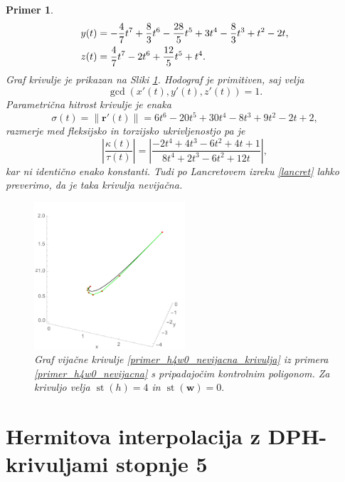 \documentclass[12pt,a4paper,twoside]{article}
\theoremstyle{definition} %
\theoremstyle{plain} %
\theoremstyle{primerstyle}
\newtheorem{primer}[definicija]{Primer}
\numberwithin{equation}{section}  %
\newcommand{\rV}{\mathbf{r}}
\newcommand{\wV}{\mathbf{w}}
\DeclareMathOperator{\st}{st}
\begin{document}
\begin{primer}
\begin{align}
		y(t)&=-\frac{4}{7}t^7+\frac{8}{3}t^6-\frac{28}{5}t^5+3t^4-\frac{8}{3}t^3+t^2-2t,\label{primer_h4w0_nevijacna_krivulja}\\
		z(t)&=\frac{4}{7}t^7-2t^6+\frac{12}{5}t^5+t^4.\notag
	\end{align}
	Graf krivulje je prikazan na Sliki \ref{fig:h4w0_nevijacna}. Hodograf je primitiven, saj velja $$\gcd(x'(t),y'(t),z'(t))=1.$$ Parametrična hitrost krivulje je enaka
	\begin{equation*}
		\sigma(t)=\lVert\rV'(t)\rVert=6t^6-20t^5+30t^4-8t^3+9t^2-2t+2,
	\end{equation*}
	razmerje med fleksijsko in torzijsko ukrivljenostjo pa je
	\begin{equation*}
		\left|\frac{\kappa(t)}{\tau(t)}\right|=\left|\frac{-2t^4+4t^3-6t^2+4t+1}{8t^4+2t^3-6t^2+12t}\right|\!,
	\end{equation*}
	kar ni identično enako konstanti. Tudi po Lancretovem izreku \ref{lancret} lahko preverimo, da je taka krivulja nevijačna.
	\clearpage
	\begin{figure}[t]
	  \centering
	  \includegraphics[width=0.5\textwidth]{images/h4w0_nevijacna.pdf}
	  \caption[Primer nevijačne krivulje ($\st(h)=4,$ $\st(\wV)=0$)]{Graf vijačne krivulje \eqref{primer_h4w0_nevijacna_krivulja} iz primera \ref{primer_h4w0_nevijacna} s pripadajočim kontrolnim poligonom. Za krivuljo velja $\st(h)=4$ in $\st(\wV)=0.$}
	  \label{fig:h4w0_nevijacna}
	\end{figure}\null
\end{primer}
\clearpage

\section{Hermitova interpolacija z DPH-krivuljami stopnje 5}
\end{document}
